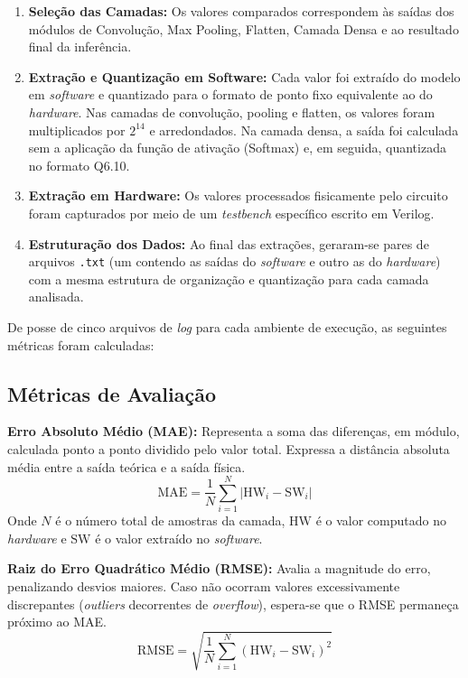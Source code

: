 \begin{enumerate}
    \item \textbf{Seleção das Camadas:} Os valores comparados correspondem às saídas dos módulos de Convolução, Max Pooling, Flatten, Camada Densa e ao resultado final da inferência.
    \item \textbf{Extração e Quantização em Software:} Cada valor foi extraído do modelo em \textit{software} e quantizado para o formato de ponto fixo equivalente ao do \textit{hardware}. Nas camadas de convolução, pooling e flatten, os valores foram multiplicados por $2^{14}$ e arredondados. Na camada densa, a saída foi calculada sem a aplicação da função de ativação (Softmax) e, em seguida, quantizada no formato Q6.10.
    \item \textbf{Extração em Hardware:} Os valores processados fisicamente pelo circuito foram capturados por meio de um \textit{testbench} específico escrito em Verilog.
    \item \textbf{Estruturação dos Dados:} Ao final das extrações, geraram-se pares de arquivos \texttt{.txt} (um contendo as saídas do \textit{software} e outro as do \textit{hardware}) com a mesma estrutura de organização e quantização para cada camada analisada.
\end{enumerate}

De posse de cinco arquivos de \textit{log} para cada ambiente de execução, as seguintes métricas foram calculadas:
\subsection{Métricas de Avaliação}

\noindent\textbf{Erro Absoluto Médio (MAE):} Representa a soma das diferenças, em módulo, calculada ponto a ponto dividido pelo valor total. Expressa a distância absoluta média entre a saída teórica e a saída física.
\begin{equation}
\text{MAE} = \frac{1}{N} \sum_{i=1}^{N} \left| \text{HW}_i - \text{SW}_i \right|
\end{equation}
Onde $N$ é o número total de amostras da camada, $\text{HW}$ é o valor computado no \textit{hardware} e $\text{SW}$ é o valor extraído no \textit{software}.

\noindent\textbf{Raiz do Erro Quadrático Médio (RMSE):} Avalia a magnitude do erro, penalizando desvios maiores. Caso não ocorram valores excessivamente discrepantes (\textit{outliers} decorrentes de \textit{overflow}), espera-se que o RMSE permaneça próximo ao MAE.
\begin{equation}
\text{RMSE} = \sqrt{\frac{1}{N} \sum_{i=1}^{N} \left( \text{HW}_i - \text{SW}_i \right)^2}
\end{equation}

